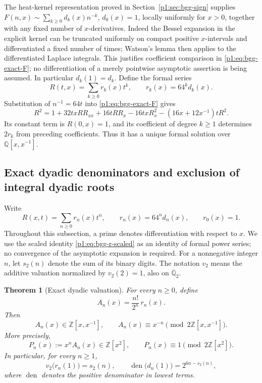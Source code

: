 \documentclass[11pt,a4paper]{article}
\newtheorem{theorem}{Theorem}[section]
\theoremstyle{definition}
\theoremstyle{remark}
\newcommand{\Q}{\mathbb Q}
\numberwithin{equation}{section}
\begin{document}
The heat-kernel representation proved in
Section~\ref{p1:sec:bgg-sign} supplies
$F(n,x)\sim\sum_{k\ge0}d_k(x)n^{-k}$, $d_0(x)=1$, locally uniformly
for $x>0$, together with any fixed number of $x$-derivatives.
Indeed the Bessel expansion in the explicit kernel can be truncated
uniformly on compact positive $x$-intervals and differentiated a fixed
number of times; Watson's lemma then applies to the differentiated
Laplace integrals. This justifies coefficient comparison in
\eqref{p1:eq:bgg-exact-F}; no differentiation of a merely pointwise
asymptotic assertion is being assumed. In particular $d_k(1)=d_k$.
Define the formal series
\[
 R(t,x)=\sum_{k\ge0}r_k(x)t^k,\qquad r_k(x)=64^kd_k(x).
\]
Substitution of $n^{-1}=64t$ into \eqref{p1:eq:bgg-exact-F} gives
\begin{equation}\label{p1:eq:bgg-r-scaled}
 R^2=1+32txRR_{xx}+16tRR_x-16txR_x^2
 -(16x+12x^{-1})tR^2.
\end{equation}
Its constant term is $R(0,x)=1$, and its coefficient of degree $k\ge1$
determines $2r_k$ from preceding coefficients. Thus it has a unique
formal solution over $\Q[x,x^{-1}]$.


\subsection{Exact dyadic denominators and exclusion of integral dyadic roots}
\label{p1:subsec:bgg-exact-dyadic}

Write
\[
 R(x,t)=\sum_{n\geq0}r_n(x)t^n,
 \qquad r_n(x)=64^n d_n(x),\qquad r_0(x)=1.
\]
Throughout this subsection, a prime denotes differentiation with respect to
$x$.  We use the scaled identity \eqref{p1:eq:bgg-r-scaled} as an identity of
formal power series; no convergence of the asymptotic expansion is required.
For a nonnegative integer $n$, let $s_2(n)$ denote the sum of its binary
digits.  The notation $v_2$ means the additive valuation normalized by
$v_2(2)=1$, also on $\overline{\mathbb Q}_2$.

\begin{theorem}[Exact dyadic valuation]
\label{p1:thm:bgg-exact-dyadic}
For every $n\geq0$, define
\[
 A_n(x)=\frac{n!}{2^n}\,r_n(x).
\]
Then
\begin{equation}
 \label{p1:eq:bgg-hurwitz-parity}
 A_n(x)\in\mathbb Z[x,x^{-1}],\qquad
 A_n(x)\equiv x^{-n}\pmod {2\mathbb Z[x,x^{-1}]}.
\end{equation}
More precisely,
\begin{equation}
 \label{p1:eq:bgg-polynomial-parity}
 P_n(x):=x^n A_n(x)\in\mathbb Z[x^2],
 \qquad P_n(x)\equiv1\pmod {2\mathbb Z[x^2]}.
\end{equation}
In particular, for every $n\geq1$,
\begin{equation}
 \label{p1:eq:bgg-exact-denominator}
 v_2\bigl(r_n(1)\bigr)=s_2(n),\qquad
 \operatorname{den}\bigl(d_n(1)\bigr)=2^{6n-s_2(n)},
\end{equation}
where $\operatorname{den}$ denotes the positive denominator in lowest terms.
\end{theorem}
\end{document}
